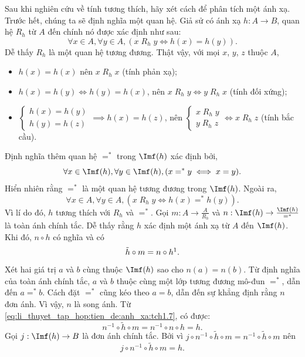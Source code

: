 Sau khi nghiên cứu về tính tương thích, hãy xét cách để phân tích một ánh xạ. Trước hết, chúng ta sẽ định nghĩa một quan hệ. Giả sử có ánh xạ $h: A \to B$, quan hệ $R_h$ từ $A$ đến chính nó được xác định như sau:
\begin{equation*}
   \forall x \in A, \forall y \in A, \left(x\;R_h\;y \iff h(x) = h(y)\right).
\end{equation*} 
Dễ thấy $R_h$ là một quan hệ tương đương. Thật vậy, với mọi $x$, $y$, $z$ thuộc $A$,
\begin{itemize}
   \item $h(x) = h(x)$ nên $x\;R_h\;x$ (tính phản xạ);
   \item $h(x) = h(y) \iff h(y) = h(x)$, nên $x\;R_h\;y \iff y\;R_h\;x$ (tính đối xứng);
   \item $\begin{cases}
      h(x) = h(y) \\
      h(y) = h(z)
   \end{cases} \implies h(x) = h(z)$, nên $\begin{cases}
      x\;R_h\;y \\
      y\;R_h\;z
   \end{cases} \iff x\;R_h\;z$ (tính bắc cầu).
\end{itemize}
Định nghĩa thêm quan hệ $=^*$ trong $\Imf(h)$ xác định bởi, 
\begin{equation*}
   \forall x \in \Imf(h), \forall y \in \Imf(h), (x =^* y \iff x = y).
\end{equation*}
Hiển nhiên rằng $=^*$ là một quan hệ tương đương trong $\Imf(h)$. Ngoài ra, 
\begin{equation*}
   \forall x \in A, \forall y \in A, \left(x\;R_h\;y \iff h(x) =^* h(y)\right).
\end{equation*} 
Vì lí do đó, $h$ tương thích với $R_h$ và $=^*$. Gọi $m: A \to \frac{A}{R_h}$ và $n: \Imf(h) \to \frac{\Imf(h)}{=^*}$ là toàn ánh chính tắc. Dễ thấy rằng $h$ xác định một ánh xạ từ $A$ đến $\Imf(h)$. Khi đó, $n \circ h$ có nghĩa và có \begin{equation}
   \tilde{h} \circ m = n \circ h\footnotemark.
   \label{eq:li_thuyet_tap_hop:tien_de:anh_xa:tch1.7}
\end{equation}
Xét hai giá trị $a$ và $b$ cùng thuộc $\Imf(h)$ sao cho $n(a) = n(b)$. Từ định nghĩa của toàn ánh chính tắc, $a$ và $b$ thuộc cùng một lớp tương đương mô-đun $=^*$, dẫn đến $a =^* b$. Cách đặt $=^*$ cũng kéo theo $a = b$, dẫn đến sự khẳng định rằng $n$ đơn ánh. Vì vậy, $n$ là song ánh. Từ \eqref{eq:li_thuyet_tap_hop:tien_de:anh_xa:tch1.7}, có được: 
\begin{equation*}
   n^{-1} \circ \tilde{h} \circ m = n^{-1} \circ n \circ h = h.
\end{equation*}
Gọi $j: \Imf(h) \to B$ là đơn ánh chính tắc. Bởi vì $j \circ n^{-1} \circ \tilde{h} \circ m  = n^{-1} \circ \tilde{h} \circ m $ nên \begin{equation*}
   j \circ n^{-1} \circ \tilde{h} \circ m = h.
\end{equation*}

